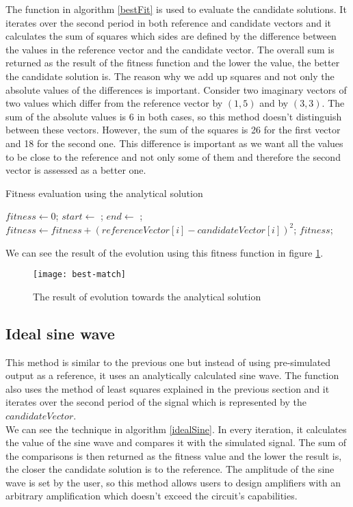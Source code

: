     The function in algorithm \ref{bestFit} is used to evaluate the candidate solutions. It iterates over the second period in both reference and candidate vectors and it calculates the sum of squares which sides are defined by the difference between the values in the reference vector and the candidate vector. The overall sum is returned as the result of the fitness function and the lower the value, the better the candidate solution is. The reason why we add up squares and not only the absolute values of the differences is important. Consider two imaginary vectors of two values which differ from the reference vector by $(1, 5)$ and by $(3,3)$. The sum of the absolute values is 6 in both cases, so this method doesn't distinguish between these vectors. However, the sum of the squares is 26 for the first vector and 18 for the second one. This difference is important as we want all the values to be close to the reference and not only some of them and therefore the second vector is assessed as a better one.

\begin{algorithm}
\caption{Fitness evaluation using the analytical solution}
\label{bestFit}
\begin{algorithmic}[1]
        \State $fitness \gets 0$;
        \State $start \gets$ ;
        \State $end \gets$ ;
            \State $fitness \gets fitness + (referenceVector[i] - candidateVector[i])^2$;
        \EndFor
        \State \Return $fitness$;
     \EndFunction
\end{algorithmic}
\end{algorithm}

We can see the result of the evolution using this fitness function in figure \ref{best-match}.

\begin{figure}[H]
    \centerline{\texttt{[image: best-match]}\label{best-match}}
    \caption{The result of evolution towards the analytical solution}
\end{figure}

\subsection{Ideal sine wave}
This method is similar to the previous one but instead of using pre-simulated output as a reference, it uses an analytically calculated sine wave. The function also uses the method of least squares explained in the previous section and it iterates over the second period of the signal which is represented by the $candidateVector$.\\
We can see the technique in algorithm \ref{idealSine}. In every iteration, it calculates the value of the sine wave and compares it with the simulated signal. The sum of the comparisons is then returned as the fitness value and the lower the result is, the closer the candidate solution is to the reference. The amplitude of the sine wave is set by the user, so this method allows users to design amplifiers with an arbitrary amplification which doesn't exceed the circuit's capabilities.

